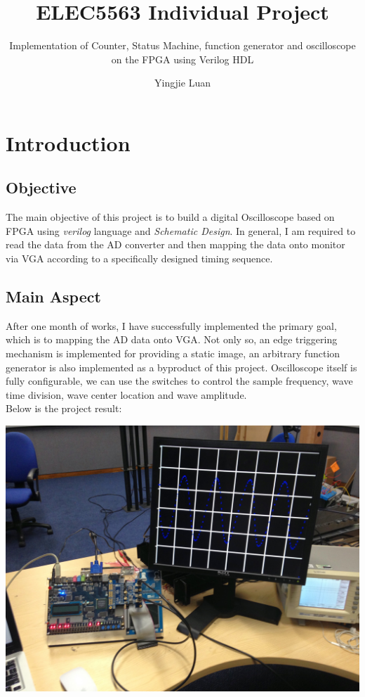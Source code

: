 \documentclass[11pt]{scrartcl}
\begin{document}
\title{ELEC5563 Individual Project}
\subtitle{ Implementation of Counter, Status Machine, function generator and oscilloscope on the FPGA using Verilog HDL}
\author{Yingjie Luan}
\maketitle

\tableofcontents

\section{Introduction}
\subsection{Objective}
The main objective of this project is to build a digital Oscilloscope based on FPGA using \textit{verilog} language and \textit{Schematic Design}. In general, I am required to read the data from the AD converter and then mapping the data onto monitor via VGA according to a specifically designed timing sequence.
\subsection{Main Aspect}
After one month of works, I have successfully implemented the primary goal, which is to mapping the AD data onto VGA. Not only so, an edge triggering mechanism is implemented for providing a static image, an arbitrary function generator is also implemented as a byproduct of this project. Oscilloscope itself is fully configurable, we can use the switches to control the sample frequency, wave time division, wave center location and wave amplitude. \\

Below is the project result:

\begin{center}
\begin{minipage}[t]{\linewidth}

{
\includegraphics[scale = 0.15]{IMG_1388.JPG}
}
\end{minipage}
\medskip
\end{center}
\end{document}
